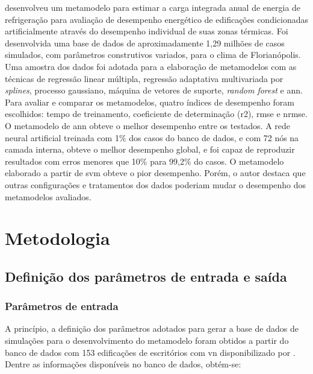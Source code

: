 \documentclass[brazil,hardcopy,openany]{ufscthesis} %
\begin{document}
 desenvolveu um metamodelo para estimar a carga integrada anual de energia de refrigeração para avaliação de desempenho energético de edificações condicionadas artificialmente através do desempenho individual de suas zonas térmicas. Foi desenvolvida uma base de dados de aproximadamente 1,29 milhões de casos simulados, com parâmetros construtivos variados, para o clima de Florianópolis. Uma amostra dos dados foi adotada para a elaboração de metamodelos com as técnicas de regressão linear múltipla, regressão adaptativa multivariada por \textit{splines}, processo gaussiano, máquina de vetores de suporte, \textit{random forest} e \acrlong{ann}. Para avaliar e comparar os metamodelos, quatro índices de desempenho foram escolhidos: tempo de treinamento, coeficiente de determinação (\acrshort{r2}), \acrshort{rmse} e \acrfull{nrmse}. O metamodelo de \acrshort{ann} obteve o melhor desempenho entre os testados. A rede neural artificial treinada com 1\% dos casos do banco de dados, e com 72 nós na camada interna, obteve o melhor desempenho global, e foi capaz de reproduzir resultados com erros menores que 10\% para 99,2\% do casos. O metamodelo elaborado a partir de \acrshort{svm} obteve o pior desempenho. Porém, o autor destaca que outras configurações e tratamentos dos dados poderiam mudar o desempenho dos metamodelos avaliados.

\chapter{Metodologia}
\label{chapter:metodologia}

\section{Definição dos parâmetros de entrada e saída}

\subsection{Parâmetros de entrada}\label{subsec:par}

A princípio, a definição dos parâmetros adotados para gerar a base de dados de simulações para o desenvolvimento do metamodelo foram obtidos a partir do banco de dados com 153 edificações de escritórios com \acrfull{vn} disponibilizado por .  		
Dentre as informações  disponíveis no banco de dados, obtém-se:
\end{document}
